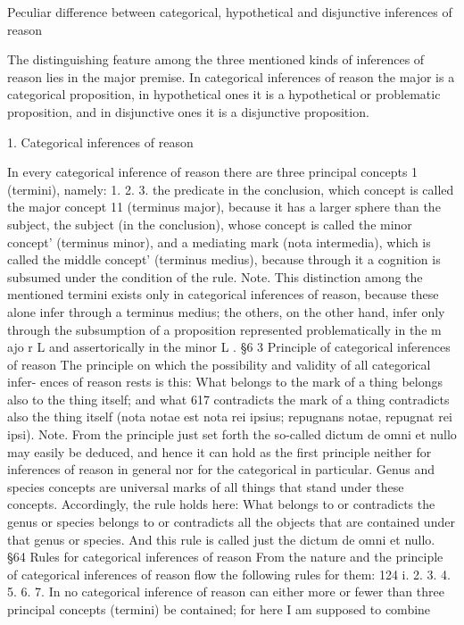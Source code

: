 Peculiar difference between categorical, hypothetical and disjunctive
inferences of reason

The distinguishing feature among the three mentioned kinds of inferences of reason
lies in the major premise.
In categorical inferences of reason the major is a categorical proposition,
in hypothetical ones it is a hypothetical or problematic proposition,
and in disjunctive ones it is a disjunctive proposition.

1. Categorical inferences of reason

In every categorical inference of reason there are three principal concepts 1
(termini), namely:
1.
2.
3.
the predicate in the conclusion, which concept is called the major concept 11
(terminus major), because it has a larger sphere than the subject,
the subject (in the conclusion), whose concept is called the minor concept'
(terminus minor), and
a mediating mark (nota intermedia), which is called the middle concept' (terminus
medius), because through it a cognition is subsumed under the condition of
the rule.
Note.
This distinction among the mentioned termini exists only in categorical
inferences of reason, because these alone infer through a terminus medius;
the others, on the other hand, infer only through the subsumption of a
proposition represented problematically in the m ajo r L and assertorically in
the minor L .
§6 3
Principle of categorical inferences of reason
The principle on which the possibility and validity of all categorical infer-
ences of reason rests is this:
What belongs to the mark of a thing belongs also to the thing itself; and what
617
contradicts the mark of a thing contradicts also the thing itself (nota notae est nota
rei ipsius; repugnans notae, repugnat rei ipsi).
Note.
From the principle just set forth the so-called dictum de omni et nullo may
easily be deduced, and hence it can hold as the first principle neither for
inferences of reason in general nor for the categorical in particular.
Genus and species concepts are universal marks of all things that stand
under these concepts. Accordingly, the rule holds here: What belongs to or
contradicts the genus or species belongs to or contradicts all the objects that are
contained under that genus or species. And this rule is called just the dictum
de omni et nullo.
§64
Rules for categorical inferences of reason
From the nature and the principle of categorical inferences of reason flow
the following rules for them:
124
i.
2.
3.
4.
5.
6.
7.
In no categorical inference of reason can either more or fewer than three
principal concepts (termini) be contained; for here I am supposed to combine
